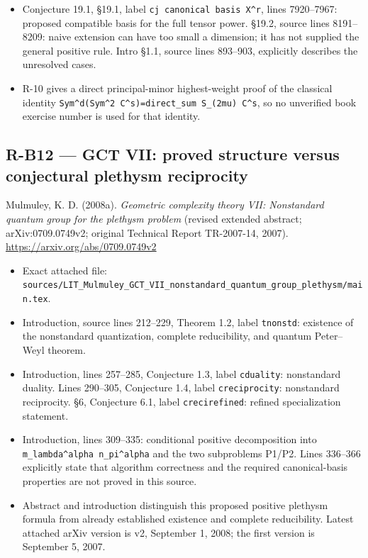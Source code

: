 \documentclass[11pt,a4paper]{article}
\providecommand{\tightlist}{\setlength{\itemsep}{0pt}\setlength{\parskip}{0pt}}
\theoremstyle{definition}\newtheorem{definition}{Definition}
\begin{document}
\begin{itemize}
  \texttt{check\_n2\_formulas.py}.
\item
  Conjecture 19.1, §19.1, label \texttt{cj\ canonical\ basis\ X\^{}r},
  lines 7920--7967: proposed compatible basis for the full tensor power.
  §19.2, source lines 8191--8209: naive extension can have too small a
  dimension; it has not supplied the general positive rule. Intro §1.1,
  source lines 893--903, explicitly describes the unresolved cases.
\item
  R-10 gives a direct principal-minor highest-weight proof of the
  classical identity
  \texttt{Sym\^{}d(Sym\^{}2\ C\^{}s)=direct\_sum\ S\_(2mu)\ C\^{}s}, so
  no unverified book exercise number is used for that identity.
\end{itemize}

\subsection{R-B12 --- GCT VII: proved structure versus conjectural
plethysm
reciprocity}\label{r-b12--gct-vii-proved-structure-versus-conjectural-plethysm-reciprocity}

Mulmuley, K. D. (2008a). \emph{Geometric complexity theory VII:
Nonstandard quantum group for the plethysm problem} (revised extended
abstract; arXiv:0709.0749v2; original Technical Report TR-2007-14,
2007). \url{https://arxiv.org/abs/0709.0749v2}

\begin{itemize}
\tightlist
\item
  Exact attached file:
  \texttt{sources/LIT\_Mulmuley\_GCT\_VII\_nonstandard\_quantum\_group\_plethysm/main.tex}.
\item
  Introduction, source lines 212--229, Theorem 1.2, label
  \texttt{tnonstd}: existence of the nonstandard quantization, complete
  reducibility, and quantum Peter--Weyl theorem.
\item
  Introduction, lines 257--285, Conjecture 1.3, label \texttt{cduality}:
  nonstandard duality. Lines 290--305, Conjecture 1.4, label
  \texttt{creciprocity}: nonstandard reciprocity. §6, Conjecture 6.1,
  label \texttt{crecirefined}: refined specialization statement.
\item
  Introduction, lines 309--335: conditional positive decomposition into
  \texttt{m\_lambda\^{}alpha\ n\_pi\^{}alpha} and the two subproblems
  P1/P2. Lines 336--366 explicitly state that algorithm correctness and
  the required canonical-basis properties are not proved in this source.
\item
  Abstract and introduction distinguish this proposed positive plethysm
  formula from already established existence and complete reducibility.
  Latest attached arXiv version is v2, September 1, 2008; the first
  version is September 5, 2007.
\end{itemize}
\end{document}
